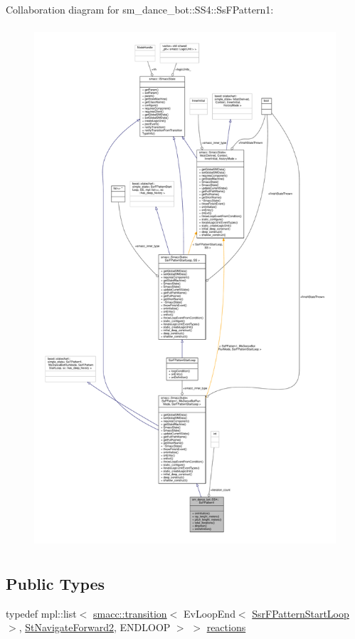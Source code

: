Collaboration diagram for sm\+\_\+dance\+\_\+bot\+:\+:S\+S4\+:\+:Ss\+F\+Pattern1\+:
\nopagebreak
\begin{figure}[H]
\begin{center}
\leavevmode
\includegraphics[height=550pt]{structsm__dance__bot_1_1SS4_1_1SsFPattern1__coll__graph}
\end{center}
\end{figure}
\subsection*{Public Types}
\begin{DoxyCompactItemize}
\item 
typedef mpl\+::list$<$ \hyperlink{classsmacc_1_1transition}{smacc\+::transition}$<$ Ev\+Loop\+End$<$ \hyperlink{structSsrFPatternStartLoop}{Ssr\+F\+Pattern\+Start\+Loop} $>$, \hyperlink{structStNavigateForward2}{St\+Navigate\+Forward2}, E\+N\+D\+L\+O\+OP $>$ $>$ \hyperlink{structsm__dance__bot_1_1SS4_1_1SsFPattern1_a05396306207d1bd51cbe752f6b97b24d}{reactions}
\end{DoxyCompactItemize}
